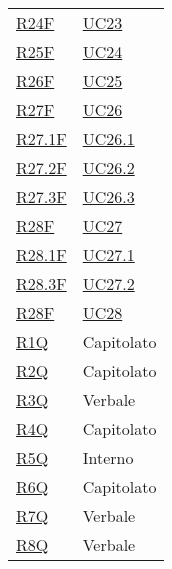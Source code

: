 \begin{center}
\begin{longtable}[!h]{p{50px} p{50px}}
        \hyperref[tab:RequisitiFunzionali]{R24F}     & \hyperref[sec:UC23]{UC23}     \\
        \hyperref[tab:RequisitiFunzionali]{R25F}     & \hyperref[sec:UC24]{UC24}     \\
        \hyperref[tab:RequisitiFunzionali]{R26F}     & \hyperref[sec:UC25]{UC25}     \\
        \hyperref[tab:RequisitiFunzionali]{R27F}     & \hyperref[sec:UC26]{UC26}     \\
        \hyperref[tab:RequisitiFunzionali]{R27.1F}   & \hyperref[sec:UC26.1]{UC26.1} \\
        \hyperref[tab:RequisitiFunzionali]{R27.2F}   & \hyperref[sec:UC26.2]{UC26.2} \\
        \hyperref[tab:RequisitiFunzionali]{R27.3F}   & \hyperref[sec:UC26.3]{UC26.3} \\
        \hyperref[tab:RequisitiFunzionali]{R28F}     & \hyperref[sec:UC27]{UC27}     \\
        \hyperref[tab:RequisitiFunzionali]{R28.1F}   & \hyperref[sec:UC27.1]{UC27.1} \\
        \hyperref[tab:RequisitiFunzionali]{R28.3F}   & \hyperref[sec:UC27.2]{UC27.2} \\
        \hyperref[tab:RequisitiFunzionali]{R28F}     & \hyperref[sec:UC28]{UC28}     \\

        \hyperref[tab:RequisitiQualita]{R1Q}         & Capitolato                    \\
        \hyperref[tab:RequisitiQualita]{R2Q}         & Capitolato                    \\
        \hyperref[tab:RequisitiQualita]{R3Q}         & Verbale                       \\
        \hyperref[tab:RequisitiQualita]{R4Q}         & Capitolato                    \\
        \hyperref[tab:RequisitiQualita]{R5Q}         & Interno                       \\
        \hyperref[tab:RequisitiQualita]{R6Q}         & Capitolato                    \\
        \hyperref[tab:RequisitiQualita]{R7Q}         & Verbale                       \\
        \hyperref[tab:RequisitiQualita]{R8Q}         & Verbale                       \\


\end{longtable}
\end{center}
